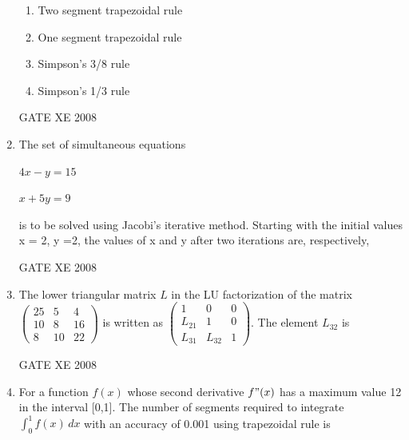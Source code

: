 \documentclass[12pt]{article}
\begin{document}
\begin{enumerate}
\begin{enumerate}
\item Two segment trapezoidal rule
\item One segment trapezoidal rule
\item Simpson's 3/8 rule
\item Simpson's 1/3 rule
\end{enumerate}

GATE XE 2008
\item The set of simultaneous equations \begin{center}$4x-y=15$ 

$x+5y=9$\end{center} is to be solved using Jacobi's iterative method. Starting with the initial values x = 2, y =2, the values of x and y after two iterations are, respectively,

\begin{enumerate}
\end{enumerate}

GATE XE 2008
\item The lower triangular matrix $L$ in the LU factorization of the matrix\newline
$\begin{pmatrix}
    25&5&4\\10&8&16\\8&10&22
\end{pmatrix}$ is written as $\begin{pmatrix}
    1&0&0\\L_{21}&1&0\\L_{31}&L_{32}&1
\end{pmatrix}$. The element $L_{32}$ is 

\begin{enumerate}
\end{enumerate}

GATE XE 2008
\item For a function $f(x)$ whose second derivative $f"(x)$ has a maximum value 12 in the interval [0,1]. The number of segments required to integrate $\int_{0}^{1} f(x) \,dx$
with an accuracy of 0.001 using trapezoidal rule is


\end{enumerate}
\end{document}
